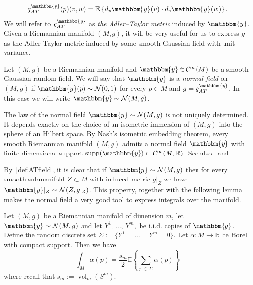 \documentclass[AHL, Unicode, longabstracts, published]{cedram}
\newcommand{\R}{\mathbb{R}}
\newcommand{\EE}{\mathbb{E}}
\DeclareMathOperator{\vol}{vol}
\newcommand{\y}{\mathbbm{y}}
\newcommand{\mC}{\mathcal{C}}
\newcommand{\clN}{\mathcal{N}}
\renewcommand{\a}{\alpha}
\newcommand*\randin{
\mathchoice {\raisebox{-.35ex}{$\displaystyle{^\subset}$}\mkern-11.5mu\raisebox{+.45ex}{$\displaystyle{_\subset}$}} {\mkern+1mu\raisebox{-.27ex}{$\textstyle{^\subset}$}\mkern-11.7mu\raisebox{+.45ex}{$\textstyle{_\subset}$}} {\raisebox{.35ex}{$\scriptstyle\subset$}\mkern-14mu\raisebox{-.15ex}{$\scriptstyle\subset$}} {\raisebox{.3ex}{$\scriptscriptstyle\subset$}\mkern-13.5mu\raisebox{-.10ex}{$\scriptscriptstyle\subset$}}}
\begin{document}
\begin{equation}\label{eq:ATmetric}
g^\y_{AT}(p)(v,w)=\EE\left\{d_p\y(v)\cdot d_p\y(w)\right\}.
\end{equation}
We will refer to $g_{AT}^\y$ as \emph{the Adler--Taylor metric} induced by $\y$. Given a Riemannian manifold $(M,g)$, it will be very useful for us to express $g$ as the Adler-Taylor metric induced by some smooth Gaussian field with unit variance.

\begin{defi}\label{def:ATfield}
Let $(M,g)$ be a Riemannian manifold and $\y\,\randin\, \mC^\infty(M)$ be a smooth Gaussian random field. We will say that $\y$ is a \emph{normal field} on $(M,g)$ if $\y(p)\sim \clN(0,1)$ for every $p\in M$ and $g=g^\y_{AT}$. In this case we will write $\y\sim \clN(M,g)$.
\end{defi}

\begin{rema}
The law of the normal field $\y\sim \clN(M,g)$ is not uniquely determined. It depends exactly on the choice of an isometric immersion of $(M,g)$ into the sphere of an Hilbert space. By Nash's isometric embedding theorem, every smooth Riemannian manifold $(M,g)$ admits a normal field $\y$ with finite dimensional support $\text{supp}(\y)\subset\mC^\infty(M,\R)$. See also~\cite{AdlerTaylor} and~\cite{Nicolaescu2016}.
\end{rema}

By~\cref{def:ATfield}, it is clear that if $\y\sim \clN(M,g)$ then for every smooth submanifold $Z\subset M$ with induced metric $g|_Z$ we have $\y|_Z\sim \clN(Z,g|_Z)$. This property, together with the following lemma makes the normal field a very good tool to express integrals over the manifold.

\begin{lemm}\label{lem:Montecarlo}
Let $(M,g)$ be a Riemannian manifold of dimension $m$, let $\y\sim\clN(M,g)$ and let $Y^1,\,\ldots,\,Y^m,$ be i.i.d. copies of $\y$. Define the random discrete set $\Sigma:=\{Y^1=\dots =Y^m=0\}$. Let $\a\colon M\to \R$ be Borel with compact support. Then we have
\begin{equation*}
\int_M\a(p)=\frac{s_m}{2}\EE\left\{\sum_{p\,\in\,\Sigma}\a(p)\right\}
\end{equation*}
where recall that $s_m:=\vol_m(S^m).$
\end{lemm}
\end{document}
